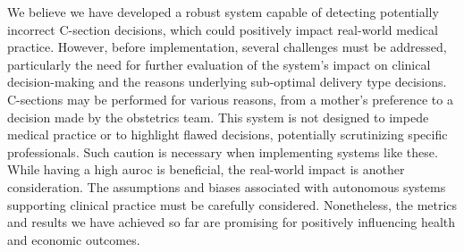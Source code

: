 
We believe we have developed a robust system capable of detecting potentially incorrect C-section decisions, which could positively impact real-world medical practice. However, before implementation, several challenges must be addressed, particularly the need for further evaluation of the system's impact on clinical decision-making and the reasons underlying sub-optimal delivery type decisions. C-sections may be performed for various reasons, from a mother's preference to a decision made by the obstetrics team. This system is not designed to impede medical practice or to highlight flawed decisions, potentially scrutinizing specific professionals. Such caution is necessary when implementing systems like these. While having a high \ac{auroc} is beneficial, the real-world impact is another consideration. The assumptions and biases associated with autonomous systems supporting clinical practice must be carefully considered. Nonetheless, the metrics and results we have achieved so far are promising for positively influencing health and economic outcomes.